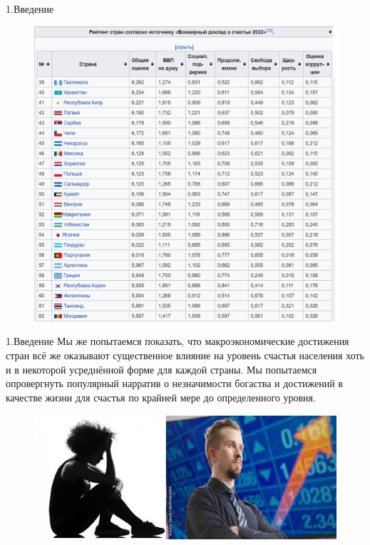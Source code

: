 \documentclass[aspectratio=169]{beamer}
\begin{document}
\begin{frame}{1.Введение} 
   
   \begin{figure} \label{hompic}
            \centering
            \includegraphics[scale=0.32]{TableKorea.png}
    \end{figure}

\end{frame}

\begin{frame}{1.Введение}
   Мы же попытаемся показать, что макроэкономические достижения стран всё же оказывают существенное влияние на уровень счастья населения хоть и в некоторой усреднённой форме для каждой страны. Мы попытаемся опровергнуть популярный нарратив о незначимости богаства и достижений в качестве жизни для счастья по крайней мере до определенного уровня.  
   \begin{figure} \label{hompic}
            \centering
            \includegraphics[scale=1]{Union2.png}
    \end{figure}
\end{frame}
\end{document}

